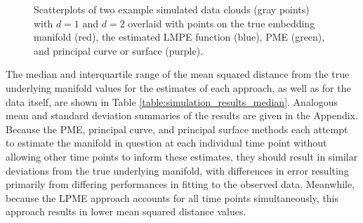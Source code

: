 \documentclass[12pt]{article}
\theoremstyle{definition}
\begin{document}
\begin{figure}[h]
  \centering
  \vfill
  
  \caption{Scatterplots of two example simulated data clouds (gray points) with $d=1$ and $d=2$ overlaid with points on the true embedding manifold (red), the estimated LMPE function (blue), PME (green), and principal curve or surface (purple).}
  \label{fig:sim_results}
\end{figure}

The median and interquartile range of the mean squared distance from the true underlying manifold values for the estimates of each approach, as well as for the data itself, are shown in Table \ref{table:simulation_results_median}. Analogous mean and standard deviation summaries of the results are given in the Appendix. Because the PME, principal curve, and principal surface methods each attempt to estimate the manifold in question at each individual time point without allowing other time points to inform these estimates, they should result in similar deviations from the true underlying manifold, with differences in error resulting primarily from differing performances in fitting to the observed data. Meanwhile, because the LPME approach accounts for all time points simultaneously, this approach results in lower mean squared distance values.
\end{document}
